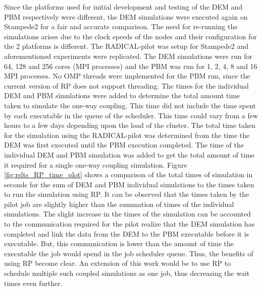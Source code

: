 \documentclass[preprint,11pt,authoryear]{elsarticle}
\begin{document}
Since the platforms used for initial development and testing of the DEM and PBM respectively were different, 
the DEM simulations were executed again on Stampede2 for a fair and accurate comparison. The need for re-running
the simulations arises due to the clock speeds of the nodes and their configuration for the 2 platforms is different.
The RADICAL-pilot was setup for Stampede2 and aforementioned experiments were replicated. The DEM simulations were 
run for 64, 128 and 256 cores (MPI processes) and the PBM was run for 1, 2, 4, 8 and 16 MPI processes. No OMP threads 
were implemented for the PBM run, since the current version of RP does not support threading. 
 The times for the individual DEM and PBM simulations were added to determine the total amount time taken to 
simulate the one-way coupling. This time did not include the time spent by each executable in the queue of the 
scheduler. This time could vary from a few hours to a few days depending upon the load of the cluster. The total 
time taken for the simulation using the RADICAL-pilot was determined from the time the DEM was first executed until 
the PBM execution completed. The time of the individual DEM and PBM simulation was added to get the total amount of 
time it required for a single one-way coupling simulation. Figure \ref{fig:rslts_RP_time_plot} shows a comparison of 
the total times of simulation in seconds for the sum of DEM and PBM individual simulations to the times taken to 
run the simulation using RP. It can be observed that the times taken by the pilot job are slightly higher 
than the summation of times of the individual simulations. The slight increase in the times of the simulation 
can be accounted to the communication required for the pilot realize that the DEM simulation has completed 
and link the data from the DEM to the PBM executable before it is executable. But, this communication is 
lower than the amount of time the executable the job would spend in the job scheduler queue. 
Thus, the benefits of using RP become clear. An extension of this work would be to use RP to schedule 
multiple such coupled simulations as one job, thus decreasing the wait times even further. 
\end{document}
